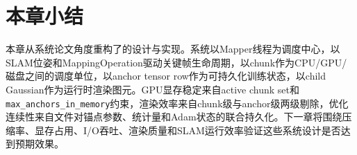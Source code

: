 \section{本章小结}

本章从系统论文角度重构了\ScaffoldChunGS 的设计与实现。系统以Mapper线程为调度中心，以SLAM位姿和MappingOperation驱动关键帧生命周期，以chunk作为CPU/GPU/磁盘之间的调度单位，以anchor tensor row作为可持久化训练状态，以child Gaussian作为运行时渲染图元。GPU显存稳定来自active chunk set和\texttt{max\_anchors\_in\_memory}约束，渲染效率来自chunk级与anchor级两级剔除，优化连续性来自\schun 文件对锚点参数、统计量和Adam状态的联合持久化。下一章将围绕压缩率、显存占用、I/O吞吐、渲染质量和SLAM运行效率验证这些系统设计是否达到预期效果。
